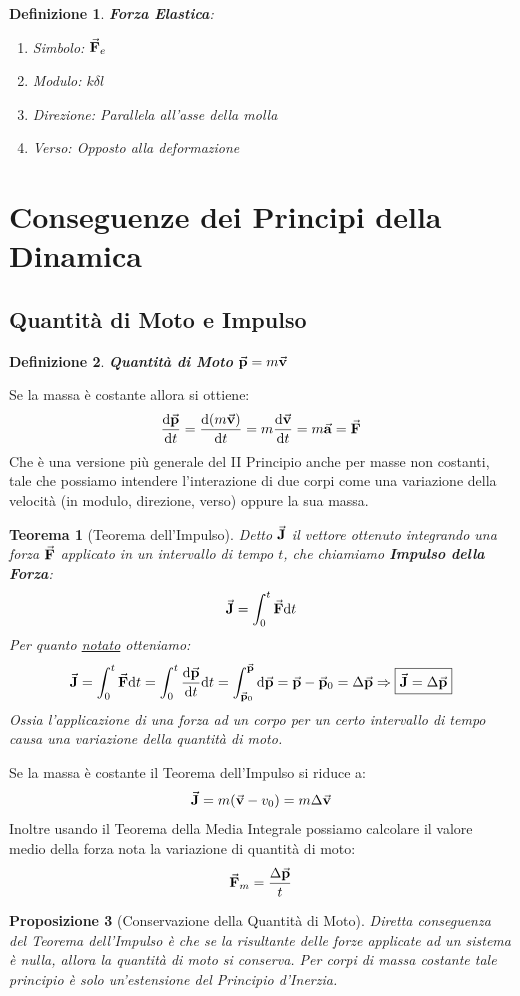 \documentclass{article}
\newtheorem{thm}{Teorema}[section]
\newtheorem{defn}{Definizione}[section]
\newtheorem{prop}[defn]{Proposizione}
\newcommand{\note}{\noindent {\quad \bf \underline{Osservazione:}} \quad}
\newcommand{\then}{\ensuremath{\Rightarrow}}
\renewcommand{\a}{\va{a}}
\renewcommand{\v}{\va{v}}
\newcommand{\F}{\va{F}}
\newcommand{\p}{\va{p}}
\newcommand{\J}{\va{J}}
\begin{document}
\begin{defn}
\textbf{Forza Elastica}:
\begin{enumerate}
    \item Simbolo: $\va{F}_e$
    \item Modulo: $k\delta l$
    \item Direzione: Parallela all'asse della molla
    \item Verso: Opposto alla deformazione
\end{enumerate}
\end{defn}

\section{Conseguenze dei Principi della Dinamica}

\subsection{Quantità di Moto e Impulso}

\begin{defn}
\textbf{Quantità di Moto} \(\p=m\v\)
\end{defn}
\note \hypertarget{quantità-forza}{Se la massa è costante allora si ottiene}:
\[\dv{\p}{t}=\dv{(m\v)}{t}=m\dv{\v}{t}=m\a=\F\]
Che è una versione più generale del II Principio anche per masse non costanti, tale che possiamo intendere l'interazione di due corpi come una variazione della velocità (in modulo, direzione, verso) oppure la sua massa.

\begin{thm}[Teorema dell'Impulso]
\label{teoremaimpulso}
Detto $\J$ il vettore ottenuto integrando una forza $\F$ applicato in un intervallo di tempo $t$, che chiamiamo \textbf{Impulso della Forza}:
\[\J=\int_0^t\F \dd t\]
Per quanto \hyperlink{quantità-forza}{notato} otteniamo:
\[\J=\int_0^t\F \dd t=\int_0^t\dv{\p}{t} \dd t=\int_{\p_0}^{\p}\dd \p=\p-\p_0=\Delta \p\then \boxed{\J=\Delta\p}\]
Ossia l'applicazione di una forza ad un corpo per un certo intervallo di tempo causa una variazione della quantità di moto.
\end{thm}
\note Se la massa è costante il Teorema dell'Impulso si riduce a:
\[\J=m(\v-v_0)=m\Delta\v\]
Inoltre usando il Teorema della Media Integrale possiamo calcolare il valore medio della forza nota la variazione di quantità di moto:
\[\F_m=\frac{\Delta\p}{t}\]

\begin{prop}[Conservazione della Quantità di Moto]
Diretta conseguenza del Teorema dell'Impulso è che se la risultante delle forze applicate ad un sistema è nulla, allora la quantità di moto si conserva. Per corpi di massa costante tale principio è solo un'estensione del Principio d'Inerzia.
\end{prop}
\end{document}

